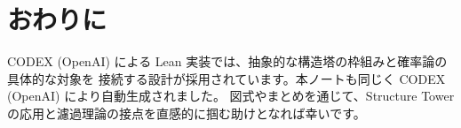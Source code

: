 \documentclass[12pt]{ltjsarticle}
\theoremstyle{definition}
\begin{document}
\section{おわりに}
CODEX (OpenAI) による Lean 実装では、抽象的な構造塔の枠組みと確率論の具体的な対象を
接続する設計が採用されています。本ノートも同じく CODEX (OpenAI) により自動生成されました。
図式やまとめを通じて、Structure Tower の応用と濾過理論の接点を直感的に掴む助けとなれば幸いです。
\end{document}
